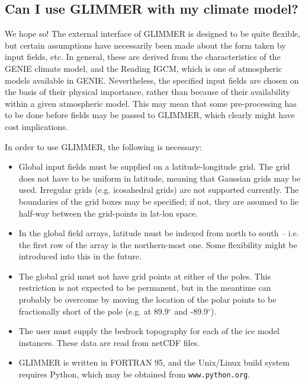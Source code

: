 \subsection{Can I use GLIMMER with my climate model?}

We hope so! The external interface of GLIMMER is designed to be quite
flexible, but certain assumptions have necessarily been made about the form
taken by input fields, etc. In general, these are derived from the
characteristics of the GENIE climate model, and the Reading IGCM, which is one
of atmospheric models available in GENIE. Nevertheless, the specified input
fields are chosen on the basis of their physical importance, rather than
because of their availability within a given atmospheric model. This may mean
that some pre-processing has to be done before fields may be passed to
GLIMMER, which clearly might have cost implications.

In order to use GLIMMER, the following is necessary:

\begin{itemize}
\item Global input fields must be supplied on a latitude-longitude
  grid. The grid does not have to be uniform in latitude, meaning that
  Gaussian grids may be used. Irregular grids (e.g. icosahedral grids) are not
  supported currently. The boundaries of the grid boxes may be specified; if
  not, they are assumed to lie half-way between the grid-points in lat-lon space.
\item In the global field arrays, latitude must be indexed from north to south
  -- i.e. the first row of the array is the northern-most one. Some
  flexibility might be introduced into this in the future.
\item The global grid must not have grid points at either of the poles. This
  restriction is not expected to be permanent, but in the meantime
  can probably be overcome by moving the location of the polar points to be
  fractionally short of the pole (e.g. at 89.9$^{\circ}$ and -89.9$^{\circ}$).
\item The user must supply the bedrock topography for each of the ice model
  instances. These data are read from netCDF files.
\item GLIMMER is written in FORTRAN 95, and the Unix/Linux build system
  requires Python, which may be obtained from \texttt{www.python.org}. 
\end{itemize}
